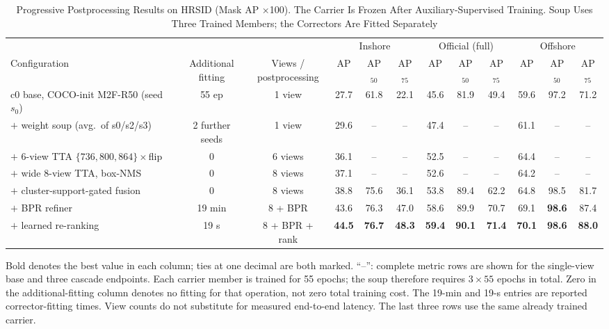 \begin{table}[!t]
\caption{Progressive Postprocessing Results on HRSID (Mask AP $\times$100). The Carrier Is Frozen After Auxiliary-Supervised Training. Soup Uses Three Trained Members; the Correctors Are Fitted Separately}
\label{tab:main}
\centering
\footnotesize
\setlength{\tabcolsep}{4pt}
\begin{tabular}{lccccccccccc}
\toprule
& & & \multicolumn{3}{c}{Inshore} & \multicolumn{3}{c}{Official (full)} & \multicolumn{3}{c}{Offshore} \\
\cmidrule(lr){4-6}\cmidrule(lr){7-9}\cmidrule(lr){10-12}
Configuration & \shortstack{Additional\\fitting} & \shortstack{Views /\\postprocessing} & AP & AP$_{50}$ & AP$_{75}$ & AP & AP$_{50}$ & AP$_{75}$ & AP & AP$_{50}$ & AP$_{75}$ \\
\midrule
c0 base, COCO-init M2F-R50 (seed $s_0$) & 55 ep & 1 view & 27.7 & 61.8 & 22.1 & 45.6 & 81.9 & 49.4 & 59.6 & 97.2 & 71.2 \\
$+$ weight soup (avg.\ of s0/s2/s3) & 2 further seeds & 1 view & 29.6 & -- & -- & 47.4 & -- & -- & 61.1 & -- & -- \\
$+$ 6-view TTA $\{736,800,864\}\times$flip & 0 & 6 views & 36.1 & -- & -- & 52.5 & -- & -- & 64.4 & -- & -- \\
$+$ wide 8-view TTA, box-NMS & 0 & 8 views & 37.1 & -- & -- & 52.6 & -- & -- & 64.2 & -- & -- \\
$+$ cluster-support-gated fusion & 0 & 8 views & 38.8 & 75.6 & 36.1 & 53.8 & 89.4 & 62.2 & 64.8 & 98.5 & 81.7 \\
\midrule
$+$ BPR refiner & 19 min & 8 + BPR & 43.6 & 76.3 & 47.0 & 58.6 & 89.9 & 70.7 & 69.1 & \textbf{98.6} & 87.4 \\
$+$ learned re-ranking & 19 s & 8 + BPR + rank & \textbf{44.5} & \textbf{76.7} & \textbf{48.3} & \textbf{59.4} & \textbf{90.1} & \textbf{71.4} & \textbf{70.1} & \textbf{98.6} & \textbf{88.0} \\
\bottomrule
\end{tabular}
\par\vspace{2pt}
\parbox{\textwidth}{\footnotesize Bold denotes the best value in each column; ties at one decimal are both marked. ``--'': complete metric rows are shown for the single-view base and three cascade endpoints. Each carrier member is trained for 55 epochs; the soup therefore requires $3\times55$ epochs in total. Zero in the additional-fitting column denotes no fitting for that operation, not zero total training cost. The 19-min and 19-s entries are reported corrector-fitting times. View counts do not substitute for measured end-to-end latency. The last three rows use the same already trained carrier.}
\end{table}


